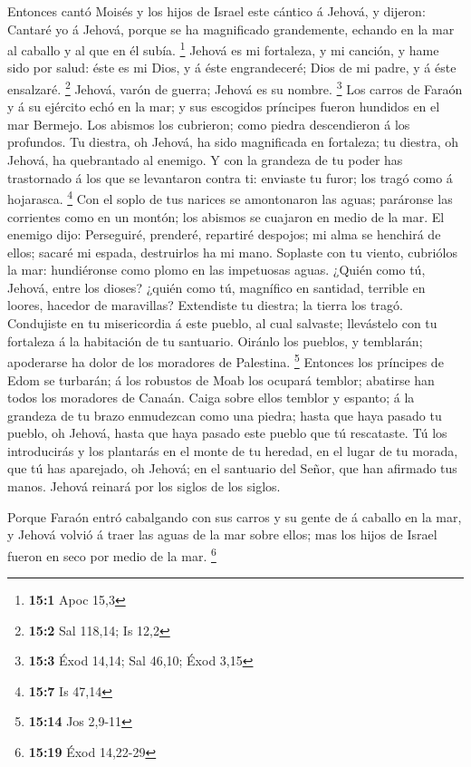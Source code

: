  Entonces cantó Moisés y los hijos de Israel este cántico á
Jehová, y dijeron: Cantaré yo á Jehová, porque se ha magnificado
grandemente, echando en la mar al caballo y al que en él subía.
\footnote{\textbf{15:1} Apoc 15,3}  Jehová es mi fortaleza,
y mi canción, y hame sido por salud: éste es mi Dios, y á éste
engrandeceré; Dios de mi padre, y á éste ensalzaré. \footnote{\textbf{15:2}
  Sal 118,14; Is 12,2}  Jehová, varón de guerra; Jehová es
su nombre. \footnote{\textbf{15:3} Éxod 14,14; Sal 46,10; Éxod 3,15}
 Los carros de Faraón y á su ejército echó en la mar; y sus
escogidos príncipes fueron hundidos en el mar Bermejo.  Los
abismos los cubrieron; como piedra descendieron á los profundos.
 Tu diestra, oh Jehová, ha sido magnificada en fortaleza; tu
diestra, oh Jehová, ha quebrantado al enemigo.  Y con la
grandeza de tu poder has trastornado á los que se levantaron contra ti:
enviaste tu furor; los tragó como á hojarasca. \footnote{\textbf{15:7}
  Is 47,14}  Con el soplo de tus narices se amontonaron las
aguas; paráronse las corrientes como en un montón; los abismos se
cuajaron en medio de la mar.  El enemigo dijo: Perseguiré,
prenderé, repartiré despojos; mi alma se henchirá de ellos; sacaré mi
espada, destruirlos ha mi mano.  Soplaste con tu viento,
cubriólos la mar: hundiéronse como plomo en las impetuosas aguas.
 ¿Quién como tú, Jehová, entre los dioses? ¿quién como tú,
magnífico en santidad, terrible en loores, hacedor de maravillas?
 Extendiste tu diestra; la tierra los tragó. 
Condujiste en tu misericordia á este pueblo, al cual salvaste;
llevástelo con tu fortaleza á la habitación de tu santuario.
 Oiránlo los pueblos, y temblarán; apoderarse ha dolor de
los moradores de Palestina. \footnote{\textbf{15:14} Jos 2,9-11}
 Entonces los príncipes de Edom se turbarán; á los robustos
de Moab los ocupará temblor; abatirse han todos los moradores de Canaán.
 Caiga sobre ellos temblor y espanto; á la grandeza de tu
brazo enmudezcan como una piedra; hasta que haya pasado tu pueblo, oh
Jehová, hasta que haya pasado este pueblo que tú rescataste.
 Tú los introducirás y los plantarás en el monte de tu
heredad, en el lugar de tu morada, que tú has aparejado, oh Jehová; en
el santuario del Señor, que han afirmado tus manos.  Jehová
reinará por los siglos de los siglos.

 Porque Faraón entró cabalgando con sus carros y su gente
de á caballo en la mar, y Jehová volvió á traer las aguas de la mar
sobre ellos; mas los hijos de Israel fueron en seco por medio de la mar.
\footnote{\textbf{15:19} Éxod 14,22-29}

